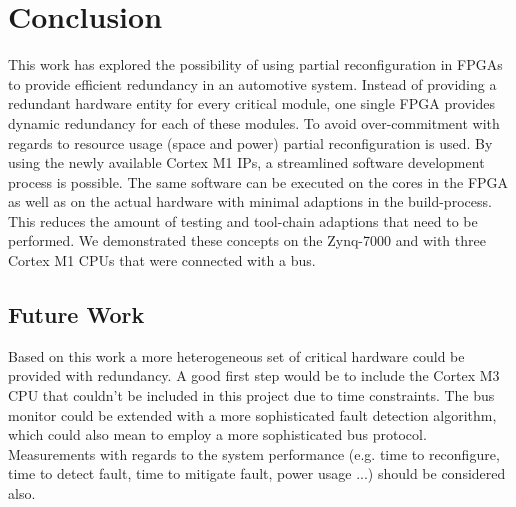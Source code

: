 \chapter{Conclusion}
This work has explored the possibility of using partial reconfiguration in \glspl{FPGA} to provide efficient redundancy in an automotive system.
Instead of providing a redundant hardware entity for every critical module, one single \gls{FPGA} provides dynamic redundancy for each of these modules.
To avoid over-commitment with regards to resource usage (space and power) partial reconfiguration is used.
By using the newly available Cortex M1 IPs, a streamlined software development process is possible. 
The same software can be executed on the cores in the \gls{FPGA} as well as on the actual hardware with minimal adaptions in the build-process.
This reduces the amount of testing and tool-chain adaptions that need to be performed.
We demonstrated these concepts on the Zynq-7000 and with three Cortex M1 \glspl{CPU} that were connected with a bus.

\section{Future Work}
Based on this work a more heterogeneous set of critical hardware could be provided with redundancy. 
A good first step would be to include the Cortex M3 CPU that couldn't be included in this project due to time constraints.
The bus monitor could be extended with a more sophisticated fault detection algorithm, which could also mean to employ a more sophisticated bus protocol.
Measurements with regards to the system performance (e.g. time to reconfigure, time to detect fault, time to mitigate fault, power usage ...) should be considered also.  